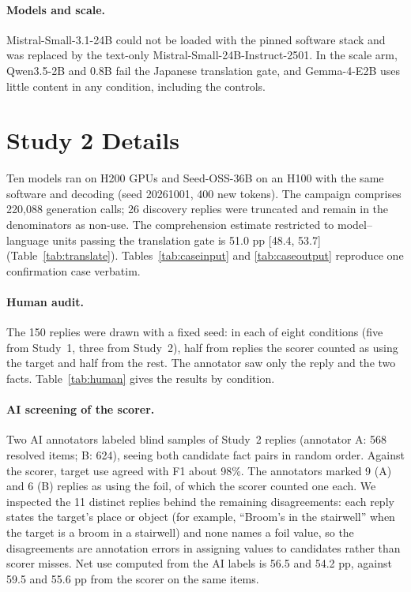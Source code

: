 \paragraph{Models and scale.} Mistral-Small-3.1-24B could not be loaded with the pinned software stack and was replaced by the text-only Mistral-Small-24B-Instruct-2501. In the scale arm, Qwen3.5-2B and 0.8B fail the Japanese translation gate, and Gemma-4-E2B uses little content in any condition, including the controls.


\section{Study 2 Details}
\label{app:s2}
Ten models ran on H200 GPUs and Seed-OSS-36B on an H100 with the same software and decoding (seed 20261001, 400 new tokens). The campaign comprises 220,088 generation calls; 26 discovery replies were truncated and remain in the denominators as non-use. The comprehension estimate restricted to model--language units passing the translation gate is 51.0 pp [48.4, 53.7] (Table~\ref{tab:translate}). Tables~\ref{tab:caseinput} and \ref{tab:caseoutput} reproduce one confirmation case verbatim.

\paragraph{Human audit.} The 150 replies were drawn with a fixed seed: in each of eight conditions (five from Study~1, three from Study~2), half from replies the scorer counted as using the target and half from the rest. The annotator saw only the reply and the two facts. Table~\ref{tab:human} gives the results by condition.


\paragraph{AI screening of the scorer.} Two AI annotators labeled blind samples of Study~2 replies (annotator A: 568 resolved items; B: 624), seeing both candidate fact pairs in random order. Against the scorer, target use agreed with F1 about 98\%. The annotators marked 9 (A) and 6 (B) replies as using the foil, of which the scorer counted one each. We inspected the 11 distinct replies behind the remaining disagreements: each reply states the target's place or object (for example, ``Broom's in the stairwell'' when the target is a broom in a stairwell) and none names a foil value, so the disagreements are annotation errors in assigning values to candidates rather than scorer misses. Net use computed from the AI labels is 56.5 and 54.2 pp, against 59.5 and 55.6 pp from the scorer on the same items.



